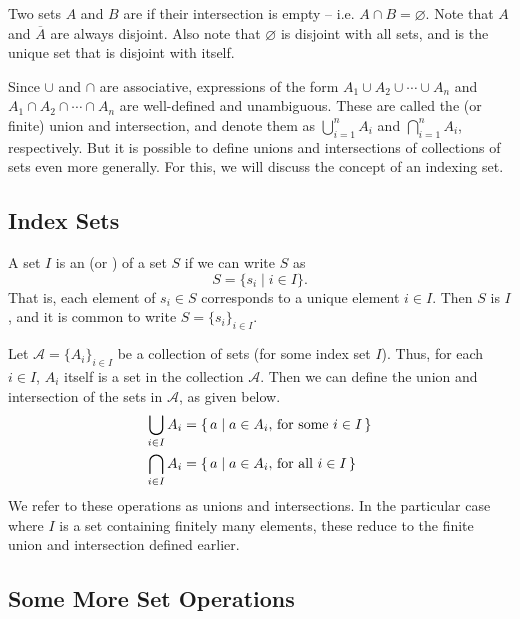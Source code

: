 Two sets $A$ and $B$ are  if their intersection is empty -- i.e. $A \cap B = \varnothing$. Note that $A$ and $\overline A$ are always disjoint. Also note that $\varnothing$ is disjoint with all sets, and is the unique set that is disjoint with itself.

Since $\cup$ and $\cap$ are associative, expressions of the form $A_1 \cup A_2 \cup \cdots \cup A_n$ and $A_1 \cap A_2 \cap \cdots \cap A_n$ are well-defined and unambiguous. These are called the  (or finite) union and intersection, and denote them as $\bigcup_{i=1}^n A_i$ and $\bigcap_{i=1}^n A_i$, respectively. But it is possible to define unions and intersections of collections of sets even more generally. For this, we will discuss the concept of an indexing set.

\subsection{Index Sets}\label{subsec:IndexSets}

A set $I$ is an  (or ) of a set $S$ if we can write $S$ as
\begin{equation*}
S = \{ s_i \mid i \in I\}.
\end{equation*}
That is, each element of $s_i \in S$ corresponds to a unique element $i \in I$. Then $S$ is  $I$, and it is common to write $S = \{ s_i \}_{i \in I}$.

Let $\mathcal A = \{ A_i \}_{i \in I}$ be a collection of sets (for some index set $I$). Thus, for each $i \in I$, $A_i$ itself is a set in the collection $\mathcal A$. Then we can define the union and intersection of the sets in $\mathcal A$, as given below.
\begin{align*}
\bigcup_{i \in I} A_i & = \qty{\, a \mid a \in A_i,\, \text{for some}~i \in I \,} \\
\bigcap_{i \in I} A_i & = \qty{\, a \mid a \in A_i,\, \text{for all}~ i \in I \,}
\end{align*}
We refer to these operations as  unions and intersections. In the particular case where $I$ is a set containing finitely many elements, these reduce to the finite union and intersection defined earlier.

\subsection{Some More Set Operations}\label{subsec:MoreSetOps}

